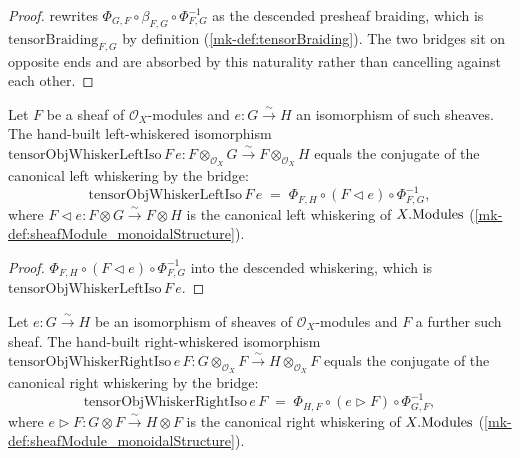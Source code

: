 \begin{proof}
  rewrites \(\Phi_{G,F} \circ \beta_{F,G} \circ \Phi_{F,G}^{-1}\) as the descended
  presheaf braiding, which is \(\mathrm{tensorBraiding}_{F,G}\) by definition
  (\ref{mk-def:tensorBraiding}). The two bridges sit on opposite ends and are
  absorbed by this naturality rather than cancelling against each other.
\end{proof}

\begin{lemma}\label{mk-lem:tensorObjWhiskerLeftIso_eq}
  \leanok

  Let \(F\) be a sheaf of \(\mathcal{O}_X\)-modules and \(e : G \xrightarrow{\sim}
  H\) an isomorphism of such sheaves. The hand-built left-whiskered isomorphism
  \(\mathrm{tensorObjWhiskerLeftIso}\,F\,e : F \otimes_{\mathcal{O}_X} G
  \xrightarrow{\sim} F \otimes_{\mathcal{O}_X} H\) equals the conjugate of the
  canonical left whiskering by the bridge:
  \[
    \mathrm{tensorObjWhiskerLeftIso}\,F\,e
      \;=\; \Phi_{F,H} \circ (F \lhd e) \circ \Phi_{F,G}^{-1},
  \]
  where \(F \lhd e : F \otimes G \xrightarrow{\sim} F \otimes H\) is the canonical
  left whiskering of \(X.\mathrm{Modules}\) (\ref{mk-def:sheafModule_monoidalStructure}).
\end{lemma}

\begin{proof}
  \(\Phi_{F,H} \circ (F \lhd e) \circ \Phi_{F,G}^{-1}\) into the descended
  whiskering, which is \(\mathrm{tensorObjWhiskerLeftIso}\,F\,e\).
\end{proof}

\begin{lemma}\label{mk-lem:tensorObjWhiskerRightIso_eq}
  \leanok

  Let \(e : G \xrightarrow{\sim} H\) be an isomorphism of sheaves of
  \(\mathcal{O}_X\)-modules and \(F\) a further such sheaf. The hand-built
  right-whiskered isomorphism \(\mathrm{tensorObjWhiskerRightIso}\,e\,F :
  G \otimes_{\mathcal{O}_X} F \xrightarrow{\sim} H \otimes_{\mathcal{O}_X} F\)
  equals the conjugate of the canonical right whiskering by the bridge:
  \[
    \mathrm{tensorObjWhiskerRightIso}\,e\,F
      \;=\; \Phi_{H,F} \circ (e \rhd F) \circ \Phi_{G,F}^{-1},
  \]
  where \(e \rhd F : G \otimes F \xrightarrow{\sim} H \otimes F\) is the canonical
  right whiskering of \(X.\mathrm{Modules}\) (\ref{mk-def:sheafModule_monoidalStructure}).
\end{lemma}

